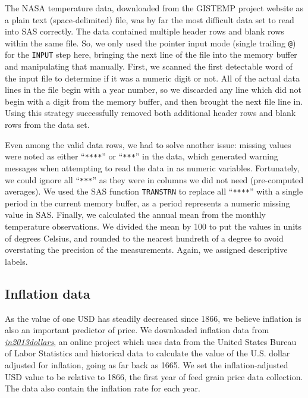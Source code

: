 \documentclass[11pt]{article}
\begin{document}
The NASA temperature data, downloaded from the GISTEMP project website as a
plain text (space-delimited) file, was by far the most difficult data set to
read into SAS correctly. The data contained multiple header rows and blank rows
within the same file. So, we only used the pointer input mode (single trailing
\texttt{@}) for the \texttt{INPUT} step here, bringing the next line of the
file into the memory buffer and manipulating that manually. First, we scanned
the first detectable word of the input file to determine if it was a numeric
digit or not. All of the actual data lines in the file begin with a year
number, so we discarded any line which did not begin with a digit from the
memory buffer, and then brought the next file line in. Using this strategy
successfully removed both additional header rows and blank rows from the data
set.

Even among the valid data rows, we had to solve another issue: missing values
were noted as either ``\texttt{****}'' or ``\texttt{***}'' in the data, which
generated warning messages when attempting to read the data in as numeric
variables. Fortunately, we could ignore all ``\texttt{***}'' as they were in
columns we did not need (pre-computed averages). We used the SAS function
\texttt{TRANSTRN} to replace all ``\texttt{****}'' with a single period in the
current memory buffer, as a period represents a numeric missing value in SAS.
Finally, we calculated the annual mean from the monthly temperature
observations. We divided the mean by 100 to put the values in units of degrees
Celsius, and rounded to the nearest hundreth of a degree to avoid overstating
the precision of the measurements. Again, we assigned descriptive labels.

\subsection*{Inflation data}

As the value of one USD has steadily decreased since 1866, we believe inflation
is also an important predictor of price. We downloaded inflation data from
\textit{\href{https://in2013dollars.com}{in2013dollars}}, an online project
which uses
data from the United States Bureau of Labor Statistics and historical data to
calculate the value of the U.S. dollar adjusted for inflation, going as far
back as 1665. We set the inflation-adjusted USD value to be relative to 1866,
the first year of feed grain price data collection. The data also contain the
inflation rate for each year.
\end{document}
